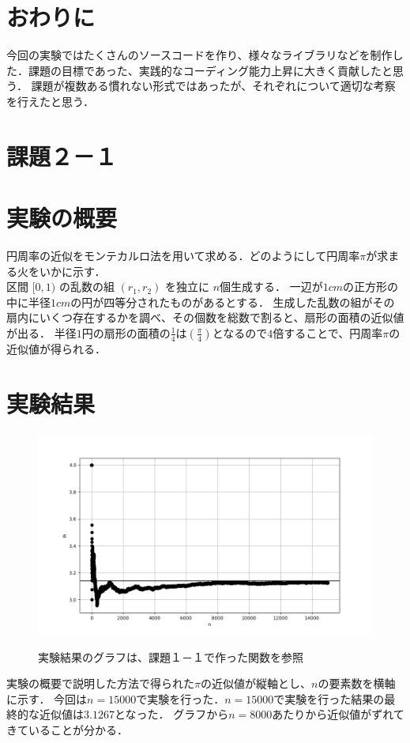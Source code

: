 \documentclass[fleqn, a4paper. 12pt]{ltjsarticle} %
\begin{document}
\section*{おわりに}
今回の実験ではたくさんのソースコードを作り、様々なライブラリなどを制作した．課題の目標であった、実践的なコーディング能力上昇に大きく貢献したと思う．
課題が複数ある慣れない形式ではあったが、それぞれについて適切な考察を行えたと思う．
\newpage
\section*{課題２－１}
\section*{実験の概要}
円周率の近似をモンテカルロ法を用いて求める．どのようにして円周率$\pi$が求まる火をいかに示す．\\
区間 $[0,1)$ の乱数の組 $(r_1,r_2)$ を独立に $n$個生成する．
一辺が$1cm$の正方形の中に半径$1cm$の円が四等分されたものがあるとする．
生成した乱数の組がその扇内にいくつ存在するかを調べ、その個数を総数で割ると、扇形の面積の近似値が出る．
半径$1$円の扇形の面積の$\frac{1}{4}$は$(\frac{\pi}{4})$となるので$4$倍することで、円周率$\pi$の近似値が得られる．
\section*{実験結果}
\begin{figure}[tb]
  \centering
  \includegraphics[width=\textwidth]{my_plot2-1.png}
  \label{f1}
  \caption{実験結果のグラフは、課題１－１で作った関数を参照}
\end{figure}
実験の概要で説明した方法で得られた$\pi$の近似値が縦軸とし、$n$の要素数を横軸に示す．
今回は$n = 15000$で実験を行った．$n = 15000$で実験を行った結果の最終的な近似値は$3.1267$となった．
グラフから$n = 8000 $あたりから近似値がずれてきていることが分かる．
\end{document}
